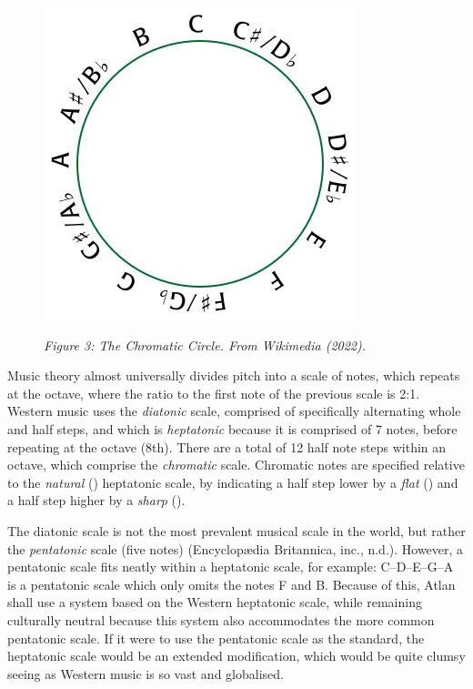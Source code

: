 \begin{figure}
\includegraphics[scale=0.35]{./Images/pitch.jpg}

{\it \footnotesize Figure 3: The Chromatic Circle. From Wikimedia (2022).}

\end{figure}

\noindent Music theory almost universally divides pitch into a scale of notes, which repeats at the octave, where the ratio to the first note of the previous scale is 2:1. Western music uses the \textit{diatonic} scale, comprised of specifically alternating whole and half steps, and which is \textit{heptatonic} because it is comprised of 7 notes, before repeating at the octave (8th). There are a total of 12 half note steps within an octave, which comprise the \textit{chromatic} scale. Chromatic notes are specified relative to the \textit{natural} (\natural) heptatonic scale, by indicating a half step lower by a \textit{flat} (\flat) and a half step higher by a \textit{sharp}  (\sharp). 



The diatonic scale is not the most prevalent musical scale in the world,  but rather the \textit{pentatonic} scale (five notes) (Encyclop\ae dia Britannica, inc., n.d.). However, a pentatonic scale fits neatly within a heptatonic scale, for example: C–D–E–G–A is a pentatonic scale which only omits the notes F and B. Because of this, Atlan shall use a system based on the Western heptatonic scale, while remaining culturally neutral because this system also accommodates the more common pentatonic scale. If it were to use the pentatonic scale as the standard, the heptatonic scale would be an extended modification, which would be quite clumsy seeing as Western music is so vast and globalised. 

